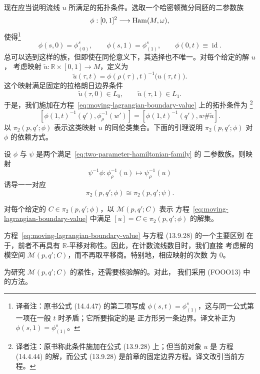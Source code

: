 现在应当说明流线 $u$ 所满足的拓扑条件。选取一个哈密顿微分同胚的二参数族
\[
  \phi:[0,1]^2\longrightarrow\operatorname{Ham}(M,\omega),
\]
使得\footnote{译者注：原书公式 (14.4.47) 的第二项写成
$\phi(s,t)=\phi_{(1)}^s$，这与同一公式第一项在一般 $t$ 时矛盾；它所要指定的是
正方形另一条边界。译文补正为 $\phi(s,1)=\phi_{(1)}^s$。}
\begin{equation}
  \phi(s,0)=\phi_{(0)}^s,
  \qquad
  \phi(s,1)=\phi_{(1)}^s,
  \qquad
  \phi(0,t)\equiv\operatorname{id}.
\label{eq:two-parameter-hamiltonian-family}
\end{equation}
总可以选到这样的族，但即使在同伦意义下，其选择也不唯一。对每个给定的解 $u$，
考虑映射 $\widetilde u:\mathbb R\times[0,1]\to M$，定义为
\[
  \widetilde u(\tau,t)
  =
  \phi(\rho(\tau),t)^{-1}\bigl(u(\tau,t)\bigr).
\]
这个映射满足固定的拉格朗日边界条件
\[
  \widetilde u(\tau,0)\in L_0,
  \qquad
  \widetilde u(\tau,1)\in L_1.
\]
于是，我们施加在方程~\eqref{eq:moving-lagrangian-boundary-value} 上的拓扑条件为
\footnote{译者注：原书称此条件施加在公式 (13.9.28) 上；但当前对象 $u$ 是
方程 (14.4.44) 的解，而公式 (13.9.28) 是前章的固定边界方程。译文改引当前方程。}
\begin{equation}
  \left[
    \phi(1,t)^{-1}(q'),
    \phi_\rho^{-1}(w')
  \right]
  =
  \left[
    \phi(1,t)^{-1}(q'),
    w\#\widetilde u
  \right].
\label{eq:moving-boundary-topological-condition}
\end{equation}
以 $\pi_2(p,q';\phi)$ 表示这类映射 $u$ 的同伦类集合。下面的引理说明
$\pi_2(p,q';\phi)$ 对 $\phi$ 的依赖方式。

\begin{lemma}
\label{lem:moving-boundary-homotopy-class-independence}
设 $\phi$ 与 $\psi$ 是两个满足~\eqref{eq:two-parameter-hamiltonian-family} 的
二参数族。则映射
\[
  \psi^{-1}\phi:
  \phi_\rho^{-1}(u)
  \longmapsto
  \psi_\rho^{-1}(u)
\]
诱导一一对应
\[
  \pi_2(p,q';\phi)
  \cong
  \pi_2(p,q';\psi).
\]
\end{lemma}

对每个给定的 $C\in\pi_2(p,q';\phi)$，以 $\mathcal M(p,q';C)$ 表示
方程~\eqref{eq:moving-lagrangian-boundary-value} 中满足
$[u]=C\in\pi_2(p,q';\phi)$ 的解集。

方程~\eqref{eq:moving-lagrangian-boundary-value} 与方程 (13.9.28) 的一个主要区别
在于，前者不再具有 $\mathbb R$-平移对称性。因此，在计数流线数目时，我们直接
考虑解的模空间 $\mathcal M(p,q';C)$，而不再取平移商。特别地，相应映射的次数
为 $0$。

为研究 $\mathcal M(p,q';C)$ 的紧性，还需要核验解的\termEnergyEstimate{}。对此，
我们采用 (FOOO13) 中的方法。

